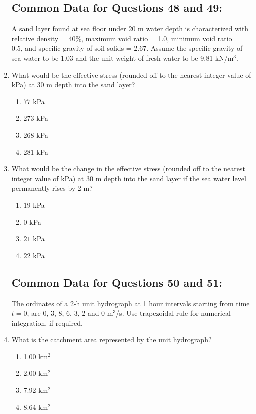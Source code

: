 \documentclass[journal,12pt,onecolumn]{IEEEtran}
\theoremstyle{remark}
\begin{document}
\begin{enumerate}
    \subsection*{Common Data for Questions 48 and 49:}
    A sand layer found at sea floor under 20 m water depth is characterized with relative density = 40\%, maximum void ratio = 1.0, minimum void ratio = 0.5, and specific gravity of soil solids = 2.67. Assume the specific gravity of sea water to be 1.03 and the unit weight of fresh water to be 9.81 kN/m$^3$.
    \item What would be the effective stress (rounded off to the nearest integer value of kPa) at 30 m depth into the sand layer?
    \begin{enumerate}
        \item $77$ kPa
        \item $273$ kPa
        \item $268$ kPa
        \item $281$ kPa
    \end{enumerate}

    \item What would be the change in the effective stress (rounded off to the nearest integer value of kPa) at 30 m depth into the sand layer if the sea water level permanently rises by 2 m?
    \begin{enumerate}
        \item $19$ kPa
        \item $0$ kPa
        \item $21$ kPa
        \item $22$ kPa
    \end{enumerate}

    \subsection*{Common Data for Questions 50 and 51:}
    The ordinates of a 2-h unit hydrograph at 1 hour intervals starting from time $t = 0$, are 0, 3, 8, 6, 3, 2 and 0 m$^3$/s. Use trapezoidal rule for numerical integration, if required.

    \item What is the catchment area represented by the unit hydrograph?
    \begin{enumerate}
    \item 1.00 km$^2$
    \item 2.00 km$^2$
    \item 7.92 km$^2$
    \item 8.64 km$^2$
    \end{enumerate}


\end{enumerate}
\end{document}
